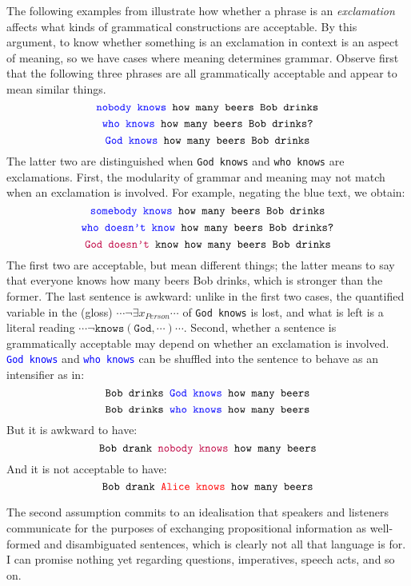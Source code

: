 \begin{example}
The following examples from \citep{linus_pauling_memorial_lecture_series_neuroscience_2018} illustrate how whether a phrase is an \emph{exclamation} affects what kinds of grammatical constructions are acceptable. By this argument, to know whether something is an exclamation in context is an aspect of meaning, so we have cases where meaning determines grammar. Observe first that the following three phrases are all grammatically acceptable and appear to mean similar things.
\[\texttt{\textcolor{blue}{nobody knows} how many beers Bob drinks}\]
\[\texttt{\textcolor{blue}{who knows} how many beers Bob drinks?}\]
\[\texttt{\textcolor{blue}{God knows} how many beers Bob drinks}\]
The latter two are distinguished when \texttt{God knows} and \texttt{who knows} are exclamations. First, the modularity of grammar and meaning may not match when an exclamation is involved. For example, negating the blue text, we obtain:
\[\texttt{\textcolor{blue}{somebody knows} how many beers Bob drinks}\]
\[\texttt{\textcolor{blue}{who doesn't know} how many beers Bob drinks?}\]
\[\texttt{\textcolor{purple}{God doesn't} know how many beers Bob drinks}\]
The first two are acceptable, but mean different things; the latter means to say that everyone knows how many beers Bob drinks, which is stronger than the former. The last sentence is awkward: unlike in the first two cases, the quantified variable in the (gloss) $\cdots \neg \exists x_{Person} \cdots$ of \texttt{God knows} is lost, and what is left is a literal reading $\cdots \neg \texttt{knows}(\texttt{God},\cdots) \cdots$.
Second, whether a sentence is grammatically acceptable may depend on whether an exclamation is involved. \texttt{\textcolor{blue}{God knows}} and \texttt{\textcolor{blue}{who knows}} can be shuffled into the sentence to behave as an intensifier as in:
\[\texttt{Bob drinks \textcolor{blue}{God knows} how many beers}\]
\[\texttt{Bob drinks \textcolor{blue}{who knows} how many beers}\]
But it is awkward to have:
\[\texttt{Bob drank \textcolor{purple}{nobody knows} how many beers}\]
And it is not acceptable to have:
\[\texttt{Bob drank \textcolor{red}{Alice knows} how many beers}\]
\end{example}


The second assumption commits to an idealisation that speakers and listeners communicate for the purposes of exchanging propositional information as well-formed and disambiguated sentences, which is clearly not all that language is for. I can promise nothing yet regarding questions, imperatives, speech acts, and so on.

